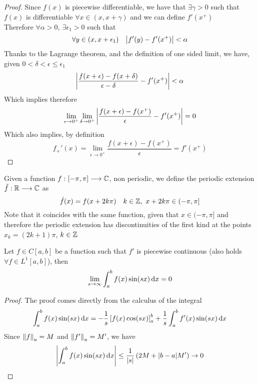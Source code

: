 \documentclass[../complete.tex]{subfiles}
\begin{document}
\begin{proof}
	Since $f(x)$ is piecewise differentiable, we have that $\exists\gamma>0$ such that $f(x)$ is differentiable $\forall x\in(x,x+\gamma)$ and we can define $f'\left( x^+ \right)$\\
	Therefore $\forall\alpha>0,\ \exists\epsilon_1>0$ such that
	\begin{equation*}
		\forall y\in(x,x+\epsilon_1)\quad\abs{f'(y)-f'(x^+)}<\alpha
	\end{equation*}
	Thanks to the Lagrange theorem, and the definition of one sided limit, we have, given $0<\delta<\epsilon\le\epsilon_1$
	\begin{equation*}
		\abs{\frac{f(x+\epsilon)-f(x+\delta)}{\epsilon-\delta}-f'(x^+)}<\alpha
	\end{equation*}
	Which implies therefore
	\begin{equation*}
		\lim_{\epsilon\to0^+}\lim_{\delta\to0^+}\abs{\frac{f(x+\epsilon)-f(x^+)}{\epsilon}-f'(x^+)}=0
	\end{equation*}
	Which also implies, by definition
	\begin{equation*}
		f_+'(x)=\lim_{\epsilon\to0^+}\frac{f(x+\epsilon)-f(x^+)}{\epsilon}=f'(x^+)
	\end{equation*}
\end{proof}
\begin{dfn}
	Given a function $f:[-\pi,\pi]\overset{}{\longrightarrow}\mathbb{C}$, non periodic, we define the periodic extension $\tilde{f}:\mathbb{R}\overset{}{\longrightarrow}\mathbb{C}$ as
	\begin{equation*}
		\tilde{f}(x)=f(x+2k\pi)\quad k\in\Z,\ x+2k\pi\in(-\pi,\pi]
	\end{equation*}
	Note that it coincides with the same function, given that $x\in(-\pi,\pi]$ and therefore the periodic extension has discontinuities of the first kind at the points $x_k=(2k+1)\pi$, $k\in\mathbb{Z}$
\end{dfn}
\begin{lem}
	Let $f\in C[a,b]$ be a function such that $f'$ is piecewise continuous (also holds $\forall f\in L^1[a,b]$), then
	\begin{equation*}
		\lim_{s\to\infty}\int_{a}^{b}f(x)\sin(sx)\operatorname{d\!} x=0
	\end{equation*}
\end{lem}
\begin{proof}
	The proof comes directly from the calculus of the integral
	\begin{equation*}
		\int_{a}^{b}f(x)\sin(sx)\operatorname{d\!} x=-\frac{1}{s}\left[ f(x)\cos(sx) \right]^b_a+\frac{1}{s}\int_{a}^{b}f'(x)\sin(sx)\operatorname{d\!} x
	\end{equation*}
	Since $\norm{f}_u=M$ and $\norm{f'}_u=M'$, we have
	\begin{equation*}
		\abs{\int_{a}^{b}f(x)\sin(sx)\operatorname{d\!} x}\le\frac{1}{\abs{s}}\left( 2M+\abs{b-a}M' \right)\to0
	\end{equation*}
\end{proof}
\end{document}
